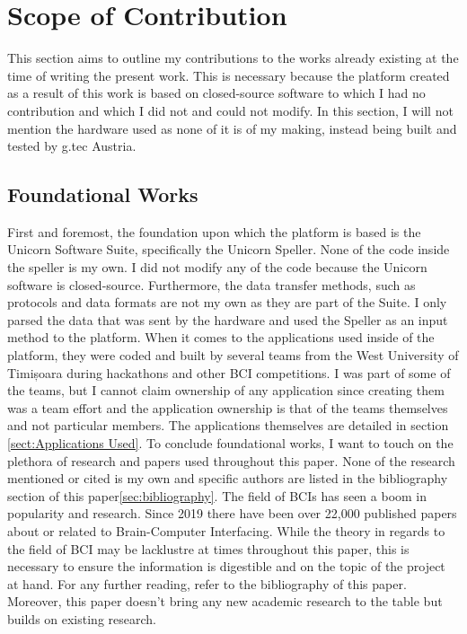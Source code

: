\section{Scope of Contribution}\label{sect:Scope of Contribution}

This section aims to outline my contributions to the works already existing at the time of writing the present work. This is necessary because the platform created as a result of this work is based on closed-source software to which I had no contribution and which I did not and could not modify. In this section, I will not mention the hardware used as none of it is of my making, instead being built and tested by g.tec Austria.


\subsection{Foundational Works}
First and foremost, the foundation upon which the platform is based is the Unicorn Software Suite, specifically the Unicorn Speller. None of the code inside the speller is my own. I did not modify any of the code because the Unicorn software is closed-source. Furthermore, the data transfer methods, such as protocols and data formats are not my own as they are part of the Suite. I only parsed the data that was sent by the hardware and used the Speller as an input method to the platform.
\vspace{\baselineskip}\newline
When it comes to the applications used inside of the platform, they were coded and built by several teams from the West University of Timișoara during hackathons and other BCI competitions. I was part of some of the teams, but I cannot claim ownership of any application since creating them was a team effort and the application ownership is that of the teams themselves and not particular members. The applications themselves are detailed in section \ref{sect:Applications Used}.
\vspace{\baselineskip}\newline
To conclude foundational works, I want to touch on the plethora of research and papers used throughout this paper. None of the research mentioned or cited is my own and specific authors are listed in the bibliography section of this paper\ref{sec:bibliography}. The field of BCIs has seen a boom in popularity and research. Since 2019 there have been over 22,000 published papers about or related to Brain-Computer Interfacing\cite{bci_scholarly_articles}. While the theory in regards to the field of BCI may be lacklustre at times throughout this paper, this is necessary to ensure the information is digestible and on the topic of the project at hand. For any further reading, refer to the bibliography of this paper. Moreover, this paper doesn't bring any new academic research to the table but builds on existing research.


